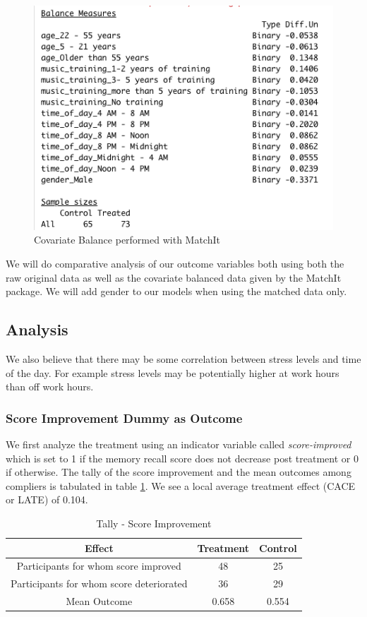 \documentclass[journal,onecolumn, 12pt]{article}
\begin{document}
\begin{figure}[h]
    \centering
    \includegraphics[scale=0.6]{images/Cobalt.png}
    \caption{Covariate Balance performed with MatchIt}
    \label{fig: cobalt}
\end{figure}

\noindent
We will do comparative analysis of our outcome variables both using both the raw original data  as well as the covariate balanced data given by the MatchIt package. We will add gender to our models when using the matched data only.

\subsection {Analysis}
We also believe that there may be some correlation between stress levels and time of the day. For example stress levels may be potentially higher at work hours than off work hours.

\subsubsection{Score Improvement Dummy as Outcome}

We first analyze the treatment using an indicator variable called \textit{score-improved} which is set to 1 if the memory recall score does not decrease post treatment or 0 if otherwise. The tally of the score improvement and the mean outcomes among compliers is tabulated in table \ref{table: scoreimp}. We see a local average treatment effect (CACE or LATE) of 0.104.

\begin{table}[h]
\begin{center}
 \begin{tabular}{||c| c c||} 
 \hline
 Effect & Treatment & Control \\  
 \hline\hline
 Participants for whom score improved & 48 & 25 \\ \hline
 Participants for whom score deteriorated & 36 & 29 \\ \hline
 Mean Outcome & 0.658 & 0.554 \\ \hline
 \end{tabular}
\caption{Tally - Score Improvement}
\label{table: scoreimp}
\end{center}
\end{table}
\end{document}
